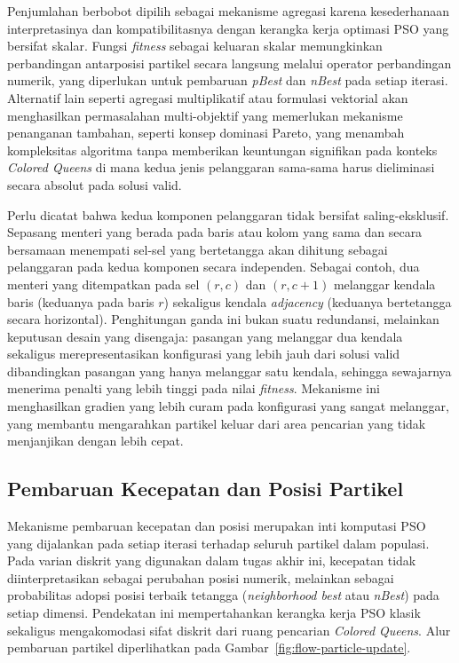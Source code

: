 Penjumlahan berbobot dipilih sebagai mekanisme agregasi karena kesederhanaan interpretasinya dan kompatibilitasnya dengan kerangka kerja optimasi PSO yang bersifat skalar. Fungsi \textit{fitness} sebagai keluaran skalar memungkinkan perbandingan antarposisi partikel secara langsung melalui operator perbandingan numerik, yang diperlukan untuk pembaruan \textit{pBest} dan \textit{nBest} pada setiap iterasi. Alternatif lain seperti agregasi multiplikatif atau formulasi vektorial akan menghasilkan permasalahan multi-objektif yang memerlukan mekanisme penanganan tambahan, seperti konsep dominasi Pareto, yang menambah kompleksitas algoritma tanpa memberikan keuntungan signifikan pada konteks \textit{Colored Queens} di mana kedua jenis pelanggaran sama-sama harus dieliminasi secara absolut pada solusi valid.

Perlu dicatat bahwa kedua komponen pelanggaran tidak bersifat saling-eksklusif. Sepasang menteri yang berada pada baris atau kolom yang sama dan secara bersamaan menempati sel-sel yang bertetangga akan dihitung sebagai pelanggaran pada kedua komponen secara independen. Sebagai contoh, dua menteri yang ditempatkan pada sel $(r, c)$ dan $(r, c+1)$ melanggar kendala baris (keduanya pada baris $r$) sekaligus kendala \textit{adjacency} (keduanya bertetangga secara horizontal). Penghitungan ganda ini bukan suatu redundansi, melainkan keputusan desain yang disengaja: pasangan yang melanggar dua kendala sekaligus merepresentasikan konfigurasi yang lebih jauh dari solusi valid dibandingkan pasangan yang hanya melanggar satu kendala, sehingga sewajarnya menerima penalti yang lebih tinggi pada nilai \textit{fitness}. Mekanisme ini menghasilkan gradien yang lebih curam pada konfigurasi yang sangat melanggar, yang membantu mengarahkan partikel keluar dari area pencarian yang tidak menjanjikan dengan lebih cepat.

\subsection{Pembaruan Kecepatan dan Posisi Partikel}
\label{subsec:flow-particle-update}

Mekanisme pembaruan kecepatan dan posisi merupakan inti komputasi PSO yang dijalankan pada setiap iterasi terhadap seluruh partikel dalam populasi. Pada varian diskrit yang digunakan dalam tugas akhir ini, kecepatan tidak diinterpretasikan sebagai perubahan posisi numerik, melainkan sebagai probabilitas adopsi posisi terbaik tetangga (\textit{neighborhood best} atau \textit{nBest}) pada setiap dimensi. Pendekatan ini mempertahankan kerangka kerja PSO klasik sekaligus mengakomodasi sifat diskrit dari ruang pencarian \textit{Colored Queens}. Alur pembaruan partikel diperlihatkan pada Gambar~\ref{fig:flow-particle-update}.

